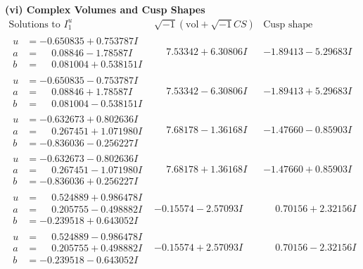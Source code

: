 \documentclass[1p]{elsarticle_modified}
\theoremstyle{definition}
\newcommand{\I}{\sqrt{-1}}
\begin{document}
\newpage\flushleft \textbf{(vi) Complex Volumes and Cusp Shapes}
$$\begin{array}{c|c|c}  
\text{Solutions to }I^u_{1}& \I (\text{vol} + \sqrt{-1}CS) & \text{Cusp shape}\\
 \hline 
\begin{aligned}
u &= -0.650835 + 0.753787 I \\
a &= \phantom{-}0.08846 - 1.78587 I \\
b &= \phantom{-}0.081004 + 0.538151 I\end{aligned}
 & \phantom{-}7.53342 + 6.30806 I & -1.89413 - 5.29683 I \\ \hline\begin{aligned}
u &= -0.650835 - 0.753787 I \\
a &= \phantom{-}0.08846 + 1.78587 I \\
b &= \phantom{-}0.081004 - 0.538151 I\end{aligned}
 & \phantom{-}7.53342 - 6.30806 I & -1.89413 + 5.29683 I \\ \hline\begin{aligned}
u &= -0.632673 + 0.802636 I \\
a &= \phantom{-}0.267451 + 1.071980 I \\
b &= -0.836036 - 0.256227 I\end{aligned}
 & \phantom{-}7.68178 - 1.36168 I & -1.47660 - 0.85903 I \\ \hline\begin{aligned}
u &= -0.632673 - 0.802636 I \\
a &= \phantom{-}0.267451 - 1.071980 I \\
b &= -0.836036 + 0.256227 I\end{aligned}
 & \phantom{-}7.68178 + 1.36168 I & -1.47660 + 0.85903 I \\ \hline\begin{aligned}
u &= \phantom{-}0.524889 + 0.986478 I \\
a &= \phantom{-}0.205755 - 0.498882 I \\
b &= -0.239518 + 0.643052 I\end{aligned}
 & -0.15574 - 2.57093 I & \phantom{-}0.70156 + 2.32156 I \\ \hline\begin{aligned}
u &= \phantom{-}0.524889 - 0.986478 I \\
a &= \phantom{-}0.205755 + 0.498882 I \\
b &= -0.239518 - 0.643052 I\end{aligned}
 & -0.15574 + 2.57093 I & \phantom{-}0.70156 - 2.32156 I \\ \hline\begin{aligned}

\end{aligned}
\end{array}$$
\end{document}
